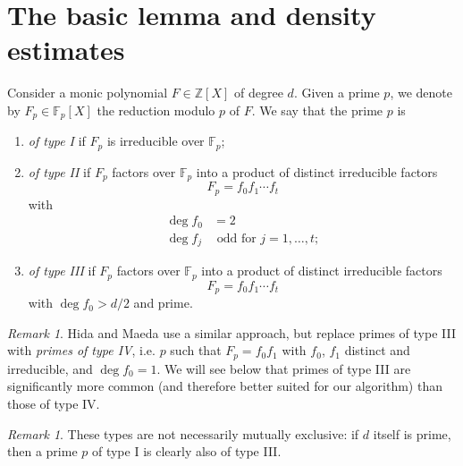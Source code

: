 \documentclass[11pt]{article}
\theoremstyle{plain}
\theoremstyle{definition}
\theoremstyle{remark}
\newtheorem{remark}[theorem]{Remark}
\numberwithin{equation}{section}
\newcommand{\ZZ}{\mathbb{Z}}
\newcommand{\FF}{\mathbb{F}}
\begin{document}
\section{The basic lemma and density estimates}
\label{sect:density}

Consider a monic polynomial $F\in\ZZ[X]$ of degree $d$.
Given a prime $p$, we denote by
$F_p\in\FF_p[X]$ the reduction modulo $p$ of $F$.  We say that the prime
$p$ is
\begin{enumerate}
  \item \emph{of type I} if $F_p$ is irreducible over $\FF_p$;
  \item \emph{of type II} if $F_p$ factors over $\FF_p$ into a product of
    distinct irreducible factors
    \begin{equation*}
      F_p=f_0f_1\cdots f_t
    \end{equation*}
    with
    \begin{align*}
      \deg f_0 &= 2\\
      \deg f_j &\text{ odd for }j=1,\ldots,t;
    \end{align*}
  \item \emph{of type III} if $F_p$ factors over $\FF_p$ into a product of
    distinct irreducible factors
    \begin{equation*}
      F_p=f_0f_1\cdots f_t
    \end{equation*}
    with $\deg f_0>d/2$ and prime.
\end{enumerate}

\begin{remark}\label{rmk:type4}
  Hida and Maeda use a similar approach, but replace primes of type III with
  \emph{primes of type IV}, i.e. $p$ such that $F_p=f_0f_1$ with $f_0$, $f_1$
  distinct and irreducible, and $\deg f_0=1$.  We will see below that primes
  of type III are significantly more common (and therefore better suited for
  our algorithm) than those of type IV.
\end{remark}

\begin{remark}
These types are not necessarily mutually exclusive: if $d$ itself is
prime, then a prime $p$ of type I is clearly also of type III.
\end{remark}
\end{document}
